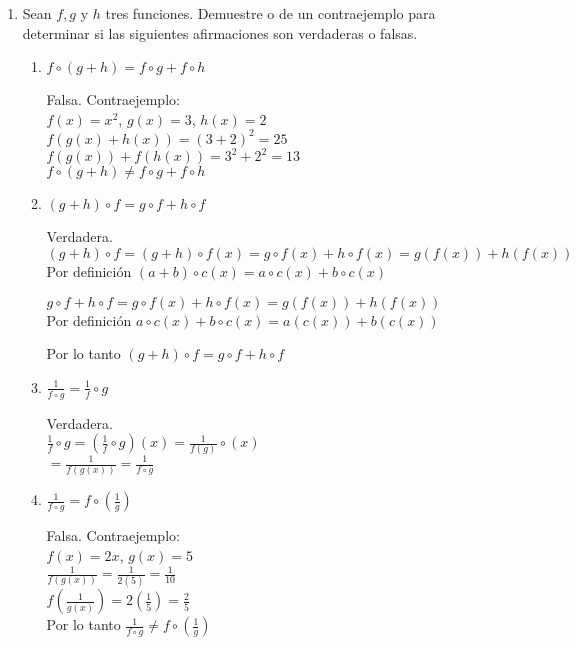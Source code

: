 \documentclass[11pt, a4paper]{article}
\begin{document}
\begin{enumerate}
\begin{enumerate}
        \end{enumerate}
        \item Sean $f, g$ y $h$ tres funciones. Demuestre o de un contraejemplo para determinar si las siguientes
        afirmaciones son verdaderas o falsas.
        \begin{enumerate}
            \item $f\circ (g+h)= f\circ g + f \circ h$
            
            Falsa. Contraejemplo:\\
            $f(x) = x^2$, $g(x) = 3$, $h(x) = 2$\\
            $f(g(x)+h(x))= (3+2)^2 = 25$\\
            $f(g(x))+f(h(x))= 3^2 + 2^2 = 13$\\
            $f\circ (g+h)\neq f\circ g + f \circ h$

            \item $(g+h)\circ f = g\circ f + h\circ f$
            
            Verdadera.\\
            $(g+h)\circ f= (g+h)\circ f(x) = g \circ f(x) + h \circ f(x)= g(f(x)) + h(f(x))$\\
            Por definición $(a+b)\circ c(x) = a \circ c(x) + b \circ c(x)$

            $g\circ f + h\circ f= g\circ f(x) + h\circ f(x)= g(f(x)) + h(f(x))$\\
            Por definición $a\circ c(x) + b\circ c(x)= a(c(x)) + b(c(x))$

            Por lo tanto $(g+h)\circ f = g\circ f + h\circ f$

            \item $\frac{1}{f\circ g}=\frac{1}{f}\circ g$
            
            Verdadera.\\
            $\frac{1}{f}\circ g= (\frac{1}{f}\circ g) (x) = \frac{1}{f(g)}\circ (x)$\\
            $= \frac{1}{f(g(x))}= \frac{1}{f\circ g}$

            \item $\frac{1}{f\circ g}= f\circ (\frac{1}{g})$
            
            Falsa. Contraejemplo:\\
            $f(x)= 2x$, $g(x)= 5$\\
            $\frac{1}{f(g(x))}= \frac{1}{2(5)}= \frac{1}{10}$\\
            $f(\frac{1}{g(x)})= 2(\frac{1}{5})= \frac{2}{5}$\\ 
            Por lo tanto $\frac{1}{f\circ g}\neq f\circ (\frac{1}{g})$
        \end{enumerate}
    \end{enumerate}
\end{document}
